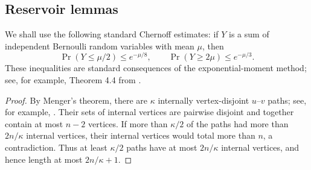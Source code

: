 \documentclass{article}
\newtheorem{lem}[thm]{Lemma}
\begin{document}
\subsection{Reservoir lemmas}

We shall use the following standard Chernoff estimates: if $Y$ is a sum of independent Bernoulli random variables with mean $\mu$, then
\begin{equation}\label{eq:Chernoff}
 \Pr(Y\le\mu/2)\le e^{-\mu/8},
 \qquad
 \Pr(Y\ge2\mu)\le e^{-\mu/3}.
\end{equation}
These inequalities are standard consequences of the exponential-moment method; see, for example, Theorem 4.4 from \cite{Mitzenmacher_Upfal_2005}.


\begin{proof}
By Menger's theorem, there are $\kappa$ internally vertex-disjoint $u$--$v$ paths; see, for example, \cite[Section 3.3]{MR3644391}.  Their sets of internal vertices are pairwise disjoint and together contain at most $n-2$ vertices.  If more than $\kappa/2$ of the paths had more than $2n/\kappa$ internal vertices, their internal vertices would total more than $n$, a contradiction.  Thus at least $\kappa/2$ paths have at most $2n/\kappa$ internal vertices, and hence length at most $2n/\kappa+1$.
\end{proof}

\end{document}
